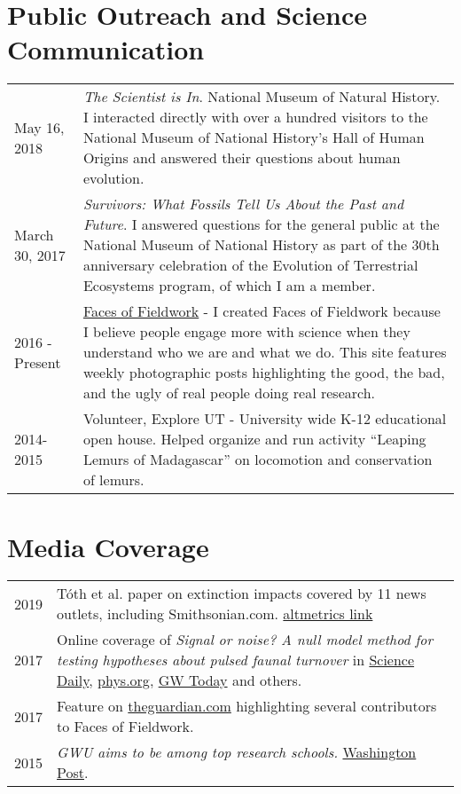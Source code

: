 \documentclass{article}
\begin{document}
\section*{Public Outreach and Science Communication}
\begin{longtable}{p{}p{}}
May 16, 2018 & \emph{The Scientist is In}. National Museum of Natural History. I interacted directly with over a hundred visitors to the National Museum of National History's Hall of Human Origins and answered their questions about human evolution.\\[4pt]
March 30, 2017 & \emph{Survivors: What Fossils Tell Us About the Past and Future}. I answered questions for the general public at the National Museum of National History as part of the 30th anniversary celebration of the Evolution of Terrestrial Ecosystems program, of which I am a member. \\[4pt]
2016 - Present & \href{http://facesoffieldwork.com}{Faces of Fieldwork} - I created Faces of Fieldwork because I believe people engage more with science when they understand who we are and what we do. This site features weekly photographic posts highlighting the good, the bad, and the ugly of real people doing real research.\\[4pt]
2014-2015 & Volunteer, Explore UT - University wide K-12 educational open house. Helped organize and run activity ``Leaping Lemurs of Madagascar'' on locomotion and conservation of lemurs.\\
\end{longtable}

\section*{Media Coverage}
\begin{longtable}{p{}p{}}
2019 & Tóth et al. paper on extinction impacts covered by 11 news outlets, including Smithsonian.com. \href{https://www.altmetric.com/details/66845562/news}{altmetrics link}\\[4pt]
2017 &  Online coverage of \emph{Signal or noise? A null model method for testing hypotheses about pulsed faunal turnover} in \href{https://www.sciencedaily.com/releases/2017/08/170804100410.htm}{Science Daily}, \href{https://phys.org/news/2017-08-paper-genus-homo-response-environmental.html}{phys.org}, \href{https://gwtoday.gwu.edu/origin-human-genus-may-have-occurred-chance}{GW Today} and others. \\[4pt]
2017 & Feature on \href{https://www.theguardian.com/lifeandstyle/2017/jul/01/pregnant-in-the-field-blog-photography-have-trowel-will-travel}{theguardian.com} highlighting several contributors to Faces of Fieldwork.\\[4pt]
2015 & \emph{GWU aims to be among top research schools.} \href{http://www.washingtonpost.com/local/education/gwu-aims-to-be-among-top-research-schools/2015/03/03/491da24e-c1f1-11e4-9ec2-b418f57a4a99_gallery.html}{Washington Post}.\\
\end{longtable}
\end{document}
